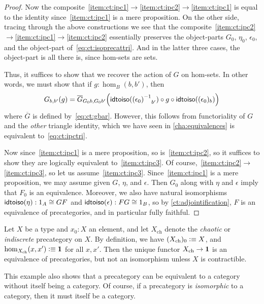 \documentclass[hott-all.tex]{subfiles}
\begin{document}
\begin{proof}
  Now the composite~\ref{item:ct:ipc1}$\to$\ref{item:ct:ipc2}$\to$\ref{item:ct:ipc1} is equal to the identity since~\ref{item:ct:ipc1} is a mere proposition.
  On the other side, tracing through the above constructions we see that the composite~\ref{item:ct:ipc2}$\to$\ref{item:ct:ipc1}$\to$\ref{item:ct:ipc2} essentially preserves the object-parts $G_0$, $\eta_0$, $\epsilon_0$, and the object-part of~\eqref{eq:ct:isoprecattri}.
  And in the latter three cases, the object-part is all there is, since hom-sets are sets.

  Thus, it suffices to show that we recover the action of $G$ on hom-sets.
  In other words, we must show that if $g:\hom_B(b,b')$, then
  \[ G_{b,b'}(g) =
  \overline{G}_{G_0b,G_0b'}\Big(\mathsf{idtoiso}(\mathord{{(\epsilon_0)}^{-1}}_{b'}) \circ g \circ \mathsf{idtoiso}((\epsilon_0)_b)\Big)
  \]
  where $\overline{G}$ is defined by~\eqref{eq:ct:gbar}.
  However, this follows from functoriality of $G$ and the \emph{other} triangle identity, which we have seen in \cref{cha:equivalences} is equivalent to~\eqref{eq:ct:ipctri}.

  Now since~\ref{item:ct:ipc1} is a mere proposition, so is~\ref{item:ct:ipc2}, so it suffices to show they are logically equivalent to~\ref{item:ct:ipc3}.
  Of course,~\ref{item:ct:ipc2}$\to$\ref{item:ct:ipc3}, so let us assume~\ref{item:ct:ipc3}.
  Since~\ref{item:ct:ipc1} is a mere proposition, we may assume given $G$, $\eta$, and $\epsilon$.
  Then $G_0$ along with $\eta$ and $\epsilon$ imply that $F_0$ is an equivalence.
  Moreover, we also have natural isomorphisms $\mathsf{idtoiso}(\eta):1_A\cong GF$ and $\mathsf{idtoiso}(\epsilon):FG\cong 1_B$, so by \cref{ct:adjointification}, $F$ is an equivalence of precategories, and in particular fully faithful.
\end{proof}


\begin{eg}\label{ct:chaotic}
  Let $X$ be a type and $x_0:X$ an element, and let $X_{\mathrm{ch}}$ denote the \emph{chaotic} or \emph{indiscrete} precategory on $X$.
  By definition, we have $(X_{\mathrm{ch}})_0\vcentcolon\equiv X$, and $\hom_{X_{\mathrm{ch}}}(x,x') \vcentcolon\equiv \mathbf{1}$ for all $x,x'$.
  Then the unique functor $X_{\mathrm{ch}}\to \mathbf{1}$ is an equivalence of precategories, but not an isomorphism unless $X$ is contractible.

  This example also shows that a precategory can be equivalent to a category without itself being a category.
  Of course, if a precategory is \emph{isomorphic} to a category, then it must itself be a category.
\end{eg}
\end{document}
